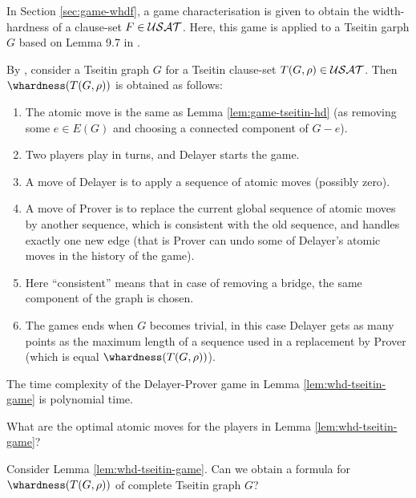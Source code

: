 \documentclass{report}
\begin{document}
In Section  \ref{sec:game-whdf}, a game characterisation is given to obtain the width-hardness of a clause-set $F \in \mathcal{USAT}$. Here, this game is applied to a Tseitin garph $G$ based on Lemma 9.7 in \cite{BeyersdorffGwynneKullmann2013PHPER}.

\begin{lem}\label{lem:whd-tseitin-game}
By \cite{BeyersdorffGwynneKullmann2013PHPER}, consider  a Tseitin graph $G$ for a Tseitin clause-set $T(G,\rho) \in \mathcal{USAT}$. Then $\whardness(T(G,\rho))$ is obtained as follows:
  \begin{enumerate}
  \item The atomic move is the same as Lemma \ref{lem:game-tseitin-hd} (as removing some $e \in E(G)$ and choosing a connected component of $G - e$).
  \item Two players play in turns, and Delayer starts the game.
  \item A move of Delayer is to apply a sequence of atomic moves (possibly zero).
  \item A move of Prover is to replace the current global sequence of atomic moves by another sequence, which is consistent with the old sequence, and handles exactly one new edge (that is Prover can undo some of Delayer's atomic moves in the history of the game).
  \item Here ``consistent'' means that in case of removing a bridge, the same component of the graph is chosen.
  \item The games ends when $G$ becomes trivial, in this case Delayer gets as many points as the maximum length of a sequence used in a replacement by Prover (which is equal $\whardness(T(G,\rho))$).
  \end{enumerate}
\end{lem}

\begin{conj}\label{con:whd-gametime}
The time complexity of the Delayer-Prover game in Lemma \ref{lem:whd-tseitin-game} is polynomial time.
\end{conj}

\begin{quest}\label{que:game-whd-atm}
What are the optimal atomic moves for the players in Lemma \ref{lem:whd-tseitin-game}?
\end{quest}

\begin{quest}\label{que:game-whd-Kn}
Consider Lemma \ref{lem:whd-tseitin-game}. Can we obtain a formula for $\whardness(T(G,\rho))$ of complete Tseitin graph $G$?
\end{quest}
\end{document}
